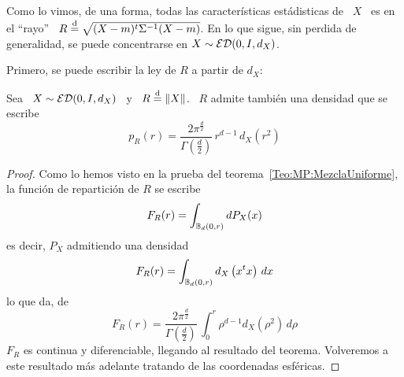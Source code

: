 Como lo vimos, de una forma, todas las caracter\'isticas est\'adisticas de \ $X$
\ es  en el ``rayo''  \ $R \stackrel{\mathrm{d}}{=}  \sqrt{(X-m)^t \Sigma^{-1} (X-m)}$. En  lo que
sigue,  sin   perdida  de  generalidad,   se  puede  concentrarse  en   $X  \sim
\mathcal{ED}(0,I,d_X)$.

Primero, se puede escribir la ley de $R$ a partir de $d_X$:
%
\begin{teorema}
\label{Teo:MP:DensidadRayo}
%
  Sea \ $X \sim \mathcal{ED}(0,I,d_X)$ \ y \ $R \stackrel{\mathrm{d}}{=} \|X\|$. \ $R$ admite tambi\'en una
  densidad que se escribe
  \[
  p_R(r)  =  \frac{2  \pi^{\frac{d}{2}}}{\Gamma\left(  \frac{d}{2}  \right)}  \,
  r^{d-1} \, d_X\left( r^2 \right)
  \]
\end{teorema}
%
\begin{proof}
  Como lo  hemos visto en la prueba  del teorema~\ref{Teo:MP:MezclaUniforme}, la
  funci\'on de repartici\'on de $R$ se escribe
  \[
  F_R(r) = \int_{\mathbb{B}_d(0,r)} dP_X(x)
  \]
  es decir, $P_X$ admitiendo una densidad
  \[
  F_R(r) = \int_{\mathbb{B}_d(0,r)} d_X\left( x^t x \right) \, dx
  \]
  lo que da, de~\cite[Ec.~4.642]{GraRyz15}
  \[
  F_R(r)  =  \frac{2  \pi^{\frac{d}{2}}}{\Gamma\left(  \frac{d}{2}  \right)}  \,
  \int_0^r \rho^{d-1} d_X\left( \rho^2 \right) \, d\rho
  \]
  $F_R$   es    continua   y   diferenciable,   llegando    al   resultado   del
  teorema.  Volveremos   a  este  resultado  m\'as  adelante   tratando  de  las
  coordenadas esf\'ericas.
\end{proof}

